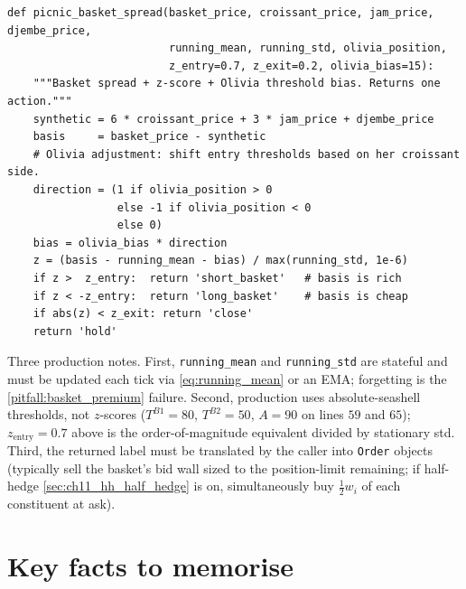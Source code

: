 \begin{lstlisting}[caption={Frankfurt-style basket spread signal with Olivia bias.}]
def picnic_basket_spread(basket_price, croissant_price, jam_price, djembe_price,
                         running_mean, running_std, olivia_position,
                         z_entry=0.7, z_exit=0.2, olivia_bias=15):
    """Basket spread + z-score + Olivia threshold bias. Returns one action."""
    synthetic = 6 * croissant_price + 3 * jam_price + djembe_price
    basis     = basket_price - synthetic
    # Olivia adjustment: shift entry thresholds based on her croissant side.
    direction = (1 if olivia_position > 0
                 else -1 if olivia_position < 0
                 else 0)
    bias = olivia_bias * direction
    z = (basis - running_mean - bias) / max(running_std, 1e-6)
    if z >  z_entry:  return 'short_basket'   # basis is rich
    if z < -z_entry:  return 'long_basket'    # basis is cheap
    if abs(z) < z_exit: return 'close'
    return 'hold'
\end{lstlisting}

Three production notes. First, \texttt{running\_mean} and
\texttt{running\_std} are stateful and must be updated each tick
via \eqref{eq:running_mean} or an EMA; forgetting is the
\cref{pitfall:basket_premium} failure. Second, production uses
absolute-seashell thresholds, not $z$-scores ($T^{B1} = 80$,
$T^{B2} = 50$, $A = 90$ on lines $59$ and $65$);
$z_{\text{entry}} = 0.7$ above is the order-of-magnitude
equivalent divided by stationary std. Third, the returned label must be translated
by the caller into \texttt{Order} objects (typically sell the
basket's bid wall sized to the position-limit remaining; if
half-hedge \cref{sec:ch11_hh_half_hedge} is on, simultaneously
buy $\tfrac{1}{2}w_i$ of each constituent at ask).

\section{Key facts to memorise}
\label{sec:ch11_keyfacts}

